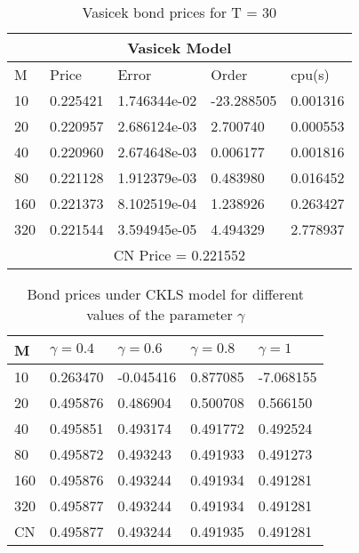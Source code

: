 \documentclass[11pt]{article}
\begin{document}
\begin{table}[htp]
\begin{tabular}{ |p{2cm}|p{3cm}|p{3cm}|p{3cm}|p{3cm}|  }
 \hline
 \multicolumn{5}{|c|}{Vasicek Model} \\
 \hline
 M & Price & Error & Order & cpu(s)\\
 \hline
10 & 0.225421 & 1.746344e-02 &  -23.288505 & 0.001316\\
20 & 0.220957 & 2.686124e-03 &  2.700740 & 0.000553\\
40 & 0.220960 & 2.674648e-03 &  0.006177 & 0.001816\\
80 & 0.221128 & 1.912379e-03 &  0.483980 & 0.016452\\
160 & 0.221373 & 8.102519e-04 &  1.238926 & 0.263427\\
320 & 0.221544 & 3.594945e-05 &  4.494329 & 2.778937\\
 \hline
 \multicolumn{5}{|c|}{CN Price = 0.221552} \\
 \hline
 
\end{tabular}
\caption{ Vasicek bond prices for T = 30}

\end{table}

\begin{table}[htp]
\begin{tabular}{ |p{2cm}|p{3cm}|p{3cm}|p{3cm}|p{3cm}|  }

 \hline
 M & $\gamma = 0.4$ & $\gamma = 0.6$ & $\gamma = 0.8$ & $\gamma = 1$\\
 \hline
10 & 0.263470 & -0.045416 &  0.877085 & -7.068155\\
20 & 0.495876 & 0.486904 & 0.500708 & 0.566150\\
40 & 0.495851 & 0.493174 & 0.491772 & 0.492524\\
80 & 0.495872 & 0.493243 & 0.491933 & 0.491273\\
160 & 0.495876  & 0.493244 & 0.491934 & 0.491281\\
320 & 0.495877  & 0.493244  & 0.491934 & 0.491281\\
 \hline
 CN & 0.495877 & 0.493244 & 0.491935 & 0.491281\\
 \hline
 
\end{tabular}
\caption{ Bond prices under CKLS model for different values of the parameter $\gamma$ }

\end{table}
\end{document}
